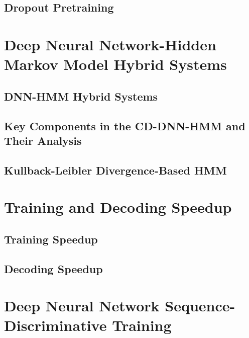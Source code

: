 \documentclass[a4paper]{article}
\begin{document}
\subsection{Dropout Pretraining}


\newpage
\section{Deep Neural Network-Hidden Markov Model Hybrid Systems}
\subsection{DNN-HMM Hybrid Systems}

\subsection{Key Components in the CD-DNN-HMM and Their Analysis}

\subsection{Kullback-Leibler Divergence-Based HMM}


\newpage
\section{Training and Decoding Speedup}
\subsection{Training Speedup}

\subsection{Decoding Speedup}


\newpage
\section{Deep Neural Network Sequence-Discriminative Training}
\end{document}
